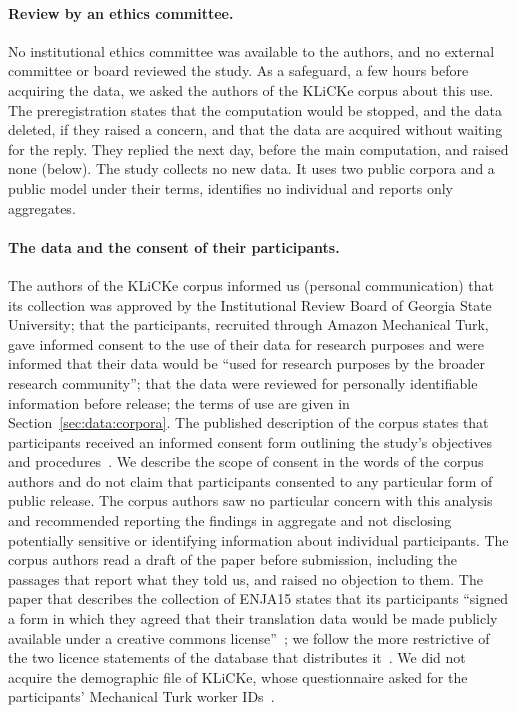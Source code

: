 \begin{ethics}
\paragraph{Review by an ethics committee.}
No institutional ethics committee was available to the authors, and no external committee or board reviewed the
study. As a safeguard, a few hours before acquiring the data, we asked the authors of the KLiCKe corpus about this
use. The preregistration states that the computation would be stopped, and the data deleted, if they raised a
concern, and that the data are acquired without waiting for the reply. They replied the next day, before the main computation, and raised
none (below). The study collects no new data. It uses two public corpora and a public
model under their terms, identifies no individual and reports only aggregates.

\paragraph{The data and the consent of their participants.}
The authors of the KLiCKe corpus informed us (personal communication) that its collection was
approved by the Institutional Review Board of Georgia State University; that the participants, recruited through
Amazon Mechanical Turk, gave informed consent to the use of their data for research purposes and were informed that
their data would be ``used for research purposes by the broader research community''; that the data were reviewed for
personally identifiable information before release; the terms of use are given in Section~\ref{sec:data:corpora}. The
published description of the corpus states that participants received an informed consent form outlining the study's
objectives and procedures~\cite{tian2025klicke}. We describe the scope of consent in the words of the corpus authors
and do not claim that participants consented to any particular form of public release. The corpus authors saw no
particular concern with this analysis and recommended reporting the findings in aggregate and not disclosing
potentially sensitive or identifying information about individual participants. The corpus authors read a draft
of the paper before submission, including the passages that report what they told us, and raised no objection to them. The paper that describes the collection of ENJA15 states that its participants ``signed a
form in which they agreed that their translation data would be made publicly available under a creative commons
license''~\cite{carl2016lrec}; we follow the more restrictive of the two licence statements of the database that
distributes it~\cite{crittlicense}. We did not acquire the demographic file of KLiCKe, whose questionnaire asked for
the participants' Mechanical Turk worker IDs~\cite{tian2025klicke}.


\end{ethics}
